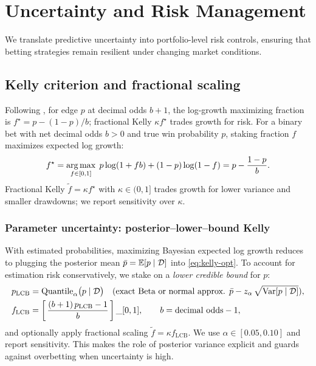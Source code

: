 \chapter{Uncertainty and Risk Management}
\label{chap:risk}
We translate predictive uncertainty into portfolio-level risk controls, ensuring that betting strategies remain resilient under changing market conditions.

\section{Kelly criterion and fractional scaling}\label{sec:kelly-math}
Following \citet{kelly1956}, for edge $p$ at decimal odds $b+1$, the log-growth maximizing fraction is $f^\star=p-(1-p)/b$; fractional Kelly $\kappa f^\star$ trades growth for risk.
For a binary bet with net decimal odds $b>0$ and true win probability $p$, staking fraction $f$
maximizes expected log growth:
\begin{equation}\label{eq:kelly-opt}
f^\star=\operatorname*{arg\,max}_{f\in[0,1]}\; p\log(1+fb)+(1-p)\log(1-f)
= p - \frac{1-p}{b}.
\end{equation}
Fractional Kelly $\tilde f=\kappa f^\star$ with $\kappa\in(0,1]$ trades growth for lower variance
and smaller drawdowns; we report sensitivity over $\kappa$.

\subsection{Parameter uncertainty: posterior–lower–bound Kelly}\label{subsec:bayes-kelly}
With estimated probabilities, maximizing Bayesian expected log growth reduces to plugging the posterior mean $\bar p=\mathbb{E}[p\mid\mathcal D]$ into \eqref{eq:kelly-opt}. To account for estimation risk conservatively, we stake on a \emph{lower credible bound} for $p$:
\begin{align}\label{eq:lcb-kelly}
&p_{\text{LCB}}=\text{Quantile}_{\alpha}\big(p\mid \mathcal D\big)\quad\text{(exact Beta or normal approx. }\bar p - z_{\alpha}\,\sqrt{\mathrm{Var}[p\mid\mathcal D]}\text{)},\\
&f_{\text{LCB}}=\left[\,\frac{(b+1)\,p_{\text{LCB}}-1}{b}\,\right]\_{[0,1]},\qquad b=\text{decimal odds}-1,
\end{align}
and optionally apply fractional scaling $\tilde f=\kappa f_{\text{LCB}}$. We use $\alpha\in[0.05,0.10]$ and report sensitivity. This makes the role of posterior variance explicit and guards against overbetting when uncertainty is high.

